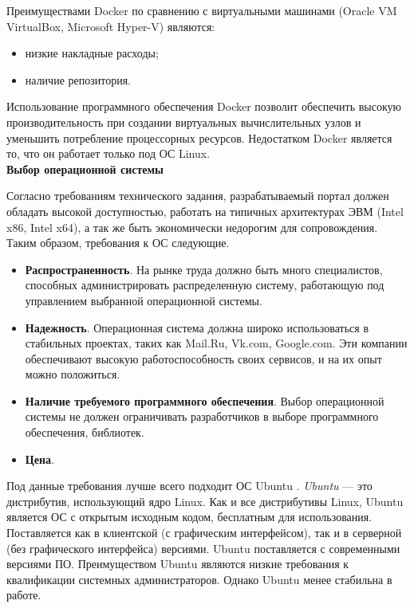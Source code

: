 Преимуществами Docker по сравнению с виртуальными машинами (Oracle VM VirtualBox, Microsoft Hyper-V) являются:
\begin{itemize}
	\item низкие накладные расходы;
	
	\item наличие репозитория.
\end{itemize}

Использование программного обеспечения Docker позволит обеспечить высокую производительность при создании виртуальных вычислительных узлов и уменьшить потребление процессорных ресурсов. Недостатком Docker является то, что он работает только под ОС Linux. \\

\textbf{Выбор операционной системы}

Согласно требованиям технического задания, разрабатываемый портал должен обладать высокой доступностью, работать на типичных архитектурах ЭВМ (Intel x86, Intel x64), а так же быть экономически недорогим для сопровождения. Таким образом, требования к ОС следующие.
\begin{itemize}
	\item \textbf{Распространенность}. На рынке труда должно быть много специалистов, способных администрировать распределенную систему, работающую под управлением выбранной операционной системы.
	
	\item \textbf{Надежность}. Операционная система должна широко использоваться в стабильных проектах, таких как Mail.Ru, Vk.com, Google.com. Эти компании обеспечивают высокую работоспособность своих сервисов, и на их опыт можно положиться.
	
	\item \textbf{Наличие требуемого программного обеспечения}. Выбор операционной системы не должен ограничивать разработчиков в выборе программного обеспечения, библиотек.
	
	\item \textbf{Цена}.
\end{itemize}
 
Под данные требования лучше всего подходит ОС Ubuntu \cite{bib:ubuntu}. \textit{Ubuntu} — это дистрибутив, использующий ядро Linux. Как и все дистрибутивы Linux, Ubuntu является ОС с открытым исходным кодом, бесплатным для использования. Поставляется как в клиентской (с графическим интерфейсом), так и в серверной (без графического интерфейса) версиями. Ubuntu поставляется с современными версиями ПО. Преимуществом Ubuntu являются низкие требования к квалификации системных администраторов. Однако Ubuntu менее стабильна в работе. \\

